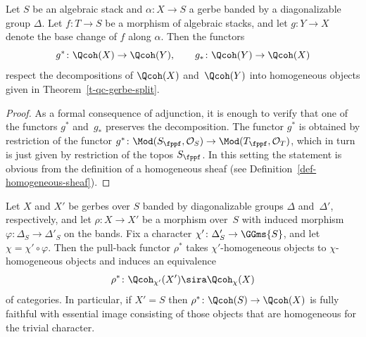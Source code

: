 \begin{proposition}
\label{p:pull-back-grading}
Let $S$ be an algebraic stack and 
$\alpha\colon X \to S$ a gerbe banded by a diagonalizable group
$\Delta$.
Let $f\colon T \to S$ be a morphism of algebraic stacks,
and let $g\colon Y \to X$ denote the base change of $f$ along
$\alpha$.
Then the functors
$$
g^*\colon \Qcoh(X) \to \Qcoh(Y), \qquad
g_*\colon \Qcoh(Y) \to \Qcoh(X)
$$
respect the decompositions of $\Qcoh(X)$ and~$\Qcoh(Y)$
into homogeneous objects given in Theorem~\ref{t-qc-gerbe-split}.
\end{proposition}
\begin{proof}
As a formal consequence of adjunction,
it is enough to verify that one of the functors $g^*$ and~$g_*$ preserves the decomposition.
The functor $g^*$ is obtained by restriction of the functor
$g^*\colon\Mod(S_\fppf, \mathcal{O}_S) \to \Mod(T_\fppf, \mathcal{O}_T)$,
which in turn is just given by restriction of the topos $S_\fppf$.
In this setting the statement is obvious from the definition of a
homogeneous sheaf
(see Definition~\ref{def-homogeneous-sheaf}).
\end{proof}

\begin{proposition}
  \label{t:equivalence-epi}
  Let $X$ and $X'$ be gerbes over $S$ banded by diagonalizable groups $\Delta$ and~$\Delta'$,
  respectively, and let $\rho\colon X \to X'$ be a morphism over~$S$ with induced morphism $\varphi\colon \Delta_S \to \Delta'_S$ on the bands.
  Fix a character $\chi'\colon \Delta'_S \to \GGms{S}$, and let $\chi =
  \chi' \circ \varphi$.
  Then the pull-back functor $\rho^*$ takes $\chi'$-homogeneous
  objects to $\chi$-homogeneous 
  objects and induces an equivalence
  \begin{equation}
    \label{eq-rho-restricted}
    \rho^*\colon 
    \Qcoh_{\chi'}(X') \sira \Qcoh_{\chi}(X)
  \end{equation}
  of categories.
  In particular, if $X' = S$ then $\rho^*\colon \Qcoh(S) \to \Qcoh(X)$ is fully faithful with 
  essential image consisting of those objects that are
  homogeneous for the trivial character. 
\end{proposition}


